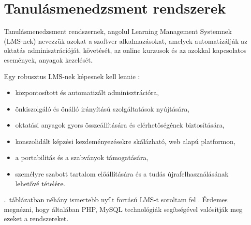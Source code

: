 \chapter{Tanulásmenedzsment rendszerek}
Tanulásmenedzsment rendszernek, angolul Learning Management Systemnek (LMS-nek) nevezzük azokat a szoftver alkalmazásokat, amelyek automatizálják az oktatás adminisztrációját, követését, az online kurzusok és az azokkal kapcsolatos események, anyagok kezelését.

Egy robusztus LMS-nek képesnek kell lennie \cite{link:ell}:
\begin{itemize}
\item központosított és automatizált adminisztrációra,
\item önkiszolgáló és önálló irányítású szolgáltatások nyújtására,
\item oktatási anyagok gyors összeállítására és elérhetőségének biztosítására,
\item konszolidált képzési kezdeményezésekre skálázható, web alapú platformon,
\item a portabilitás és a szabványok támogatására,
\item személyre szabott tartalom előállítására és a tudás újrafelhasználásának lehetővé tételére.
\end{itemize}

.~táblázatban néhány ismertebb nyílt forrású LMS-t soroltam fel \cite{link:lms}. Érdemes megnézni, hogy általában PHP, MySQL technológiák segítségével valósítják meg ezeket a rendszereket.



\begin{comment}


\bibitem[ell] {link:ell}
	Ellis, Ryann K. {\it Field Guide to Learning Management Systems}, ASTD Learning Circuits, 2009 \\ \href{http://www.astd.org/NR/rdonlyres/12ECDB99-3B91-403E-9B15-7E597444645D/23395/LMS\_fieldguide\_20091.pdf}{http://www.astd.org/NR/rdonlyres/.../LMS\_fieldguide\_20091.pdf}

\bibitem[lms] {link:lms}
	Wikipedia, {\it List of learning management systems} \\ \href{http://en.wikipedia.org/wiki/List\_of\_learning\_management\_systems}{http://en.wikipedia.org/wiki/List\_of\_learning\_management\_systems}

\end{comment}
